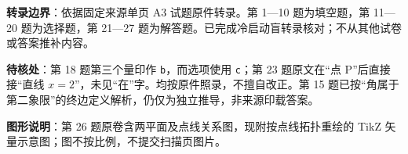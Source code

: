 

\begin{gktip}
\textbf{转录边界}：依据固定来源单页 A3 试题原件转录。第 1—10 题为填空题，第 11—20 题为选择题，第 21—27 题为解答题。已完成冷启动盲转录核对；不从其他试卷或答案推补内容。

\textbf{待核处}：第 18 题第三个量印作 \texttt{b}，而选项使用 \texttt{c}；第 23 题原文在“点 P”后直接接“直线 $x=2$”，未见“在”字。均按原件照录，不擅自改正。第 15 题已按“角属于第二象限”的终边定义解析，仍仅为独立推导，非来源印载答案。

\textbf{图形说明}：第 26 题原卷含两平面及点线关系图，现附按点线拓扑重绘的 TikZ 矢量示意图；图不按比例，不提交扫描页图片。
\end{gktip}



